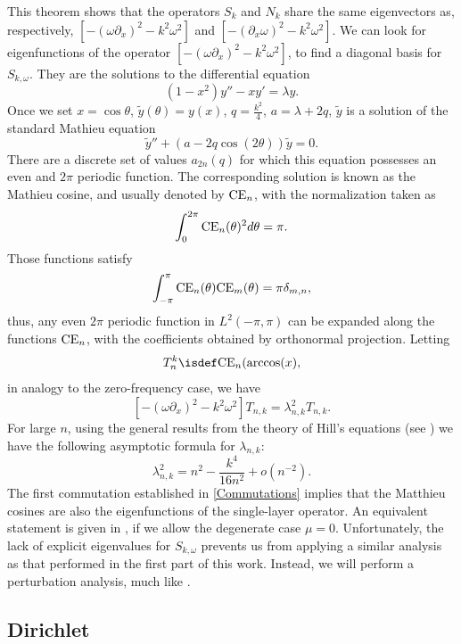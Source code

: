 \documentclass[a4paper]{article}
\begin{document}
	This theorem shows that the operators $S_k$ and $N_k$ share the same eigenvectors as, respectively, $\left[-(\omega \partial_x)^2 - k^2\omega^2\right]$ and $ \left[-(\partial_x \omega)^2 - k^2\omega^2\right]$. We can look for eigenfunctions of the operator $\left[ -(\omega \partial_x)^2 - k^2\omega^2\right]$, to find a diagonal basis for $S_{k,\omega}$. They are the solutions to the differential equation 
	\[ (1-x^2) y'' - x y' = \lambda y.\]
	Once we set $x = \cos \theta$, $\tilde{y}(\theta) = y(x)$,  $q = \frac{k^2}{4}$, $a = \lambda + 2q$, $\tilde{y}$ is a solution of the standard Mathieu equation 
	\[\tilde{y}'' + (a - 2q \cos(2\theta)) \tilde{y} = 0.\]
	There are a discrete set of values $a_{2n}(q)$ for which this equation possesses an even and $2\pi$ periodic function. The corresponding solution is known as the Mathieu cosine, and usually denoted by $\textup{CE}_n$, with the normalization taken as
	\[ \int_{0}^{2\pi} \textup{CE}_n(\theta)^2 d\theta = \pi.\]
	Those functions satisfy 
	\[ \int_{-\pi}^{\pi}\textup{CE}_n(\theta) \textup{CE}_m(\theta) = \pi \delta_{m,n},\]
	thus, any even $2\pi$ periodic function in $L^2(-\pi,\pi)$ can be expanded along the functions $\textup{CE}_n$, with the coefficients obtained by orthonormal projection. Letting 
	\[T_{n}^k \isdef \textup{CE}_n(\arccos(x),\]
	in analogy to the zero-frequency case, we have
	\[\left[-(\omega \partial_x)^2 - k^2\omega^2\right] T_{n,k} = \lambda_{n,k}^2 T_{n,k}.\]
	For large $n$, using the general results from the theory of Hill's equations (see \cite[eq. 28.29.21]{NIST:DLMF}) we have the following asymptotic formula for $\lambda_{n,k}$:
	\[ \lambda_{n,k}^2 = n^2 - \frac{k^4}{16n^2} +o \left(n^{-2}\right). \]
	The first commutation established in \autoref{Commutations} implies that the Matthieu cosines are also the eigenfunctions of the single-layer operator. An equivalent statement is given in \cite[Thm 4.2]{betcke2014spectral}, if we allow the degenerate case $\mu = 0$. Unfortunately, the lack of explicit eigenvalues for $S_{k,\omega}$ prevents us from applying a similar analysis as that performed in the first part of this work. Instead, we will perform a perturbation analysis, much like \cite{bruno2012second}. 
	
	\subsection{Dirichlet}
	
\end{document}
